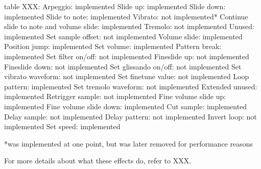 table XXX:
Arpeggio: implemented
Slide up: implemented
Slide down: implemented
Slide to note: implemented
Vibrato: not implemented*
Continue slide to note and volume slide: implemented
Tremolo: not implemented
Unused: implemented
Set sample offset: not implemented
Volume slide: implemented
Position jump: implemented
Set volume: implemented
Pattern break: implemented
Set filter on/off: not implemented
Fineslide up: not implemented
Fineslide down: not implemented
Set glissando on/off: not implemented
Set vibrato waveform: not implemented
Set finetune value: not implemented
Loop pattern: implemented
Set tremolo waveform: not implemented
Extended unused: implemented
Retrigger sample: not implemented
Fine volume slide up: implemented
Fine volume slide down: implemented
Cut sample: implemented
Delay sample: not implemented
Delay pattern: not implemented
Invert loop: not implemented
Set speed: implemented

*was implemented at one point, but was later removed for performance reasons


For more details about what these effects do, refer to XXX.
